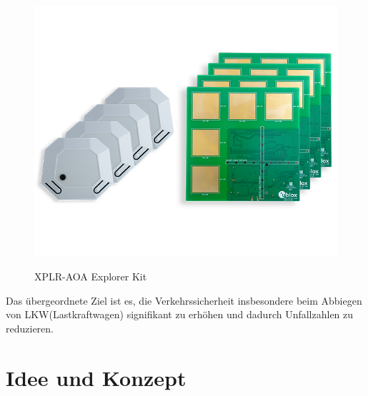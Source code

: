 \documentclass[a4paper, 12pt]{article} %
\begin{document}
\begin{spacing}{1.8}
\begin{figure}[H]
    \includegraphics[width=0.8\linewidth]{images/XPLR-AOA-with-C209-and-C211-02_0}\\[1ex]
    \centering
    \caption{XPLR-AOA Explorer Kit \cite{u_blox_xplr_aoa2_kit}}
    \label{ABBILDUNG 76}
\end{figure}

Das übergeordnete Ziel ist es, die Verkehrssicherheit insbesondere beim 
Abbiegen von LKW(Lastkraftwagen) signifikant zu erhöhen und dadurch Unfallzahlen zu reduzieren.

\end{spacing}

\clearpage

\section{Idee und Konzept}
\label{sec:Idee und Konzept}
\end{document}
